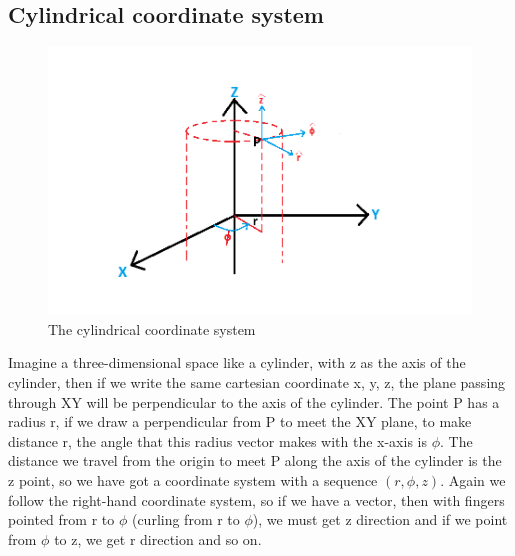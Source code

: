 \subsection{Cylindrical coordinate system}    
\begin{figure}[h]
\centering
\includegraphics[width=1\linewidth]{./graphics/cylindrical}
\caption{The cylindrical coordinate system}
\end{figure} 

Imagine a three-dimensional space like a cylinder, with z as the axis of the cylinder, then if we write the same cartesian coordinate x, y, z, the plane passing through XY will be perpendicular to the axis of the cylinder. The point P has a radius r, if we draw a perpendicular from P to meet the XY plane, to make distance r, the angle that this radius vector makes with the x-axis is $\phi$. The distance we travel from the origin to meet P along the axis of the cylinder is the z point, so we have got a coordinate system with a sequence $( r, \phi, z)$. Again we follow the right-hand coordinate system, so if we have a vector, then with fingers pointed from r to $\phi $ (curling from r to $\phi$), we must get z direction and if we point from $\phi$ to z, we get r direction and so on.

